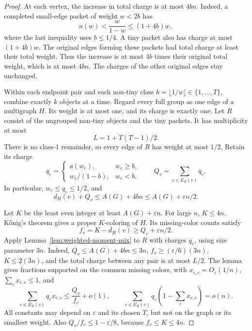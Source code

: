 \documentclass[11pt]{article}
\theoremstyle{definition}\newtheorem{algorithm}{Algorithm}[section]
\numberwithin{equation}{section}
\theoremstyle{remark}\newtheorem*{remark}{Remark}
\begin{document}
\begin{proof}
At each vertex, the increase in total charge is at most $4bn$.
Indeed, a completed small-edge packet of weight $w<2b$ has
\[
 a(w)<\frac{w}{1-w}\le(1+4b)w,
\]
where the last inequality uses $b\le1/4$.
A tiny packet also has charge at most $(1+4b)w$.
The original edges forming these packets had total charge at least
their total weight. Thus the increase is at most $4b$ times their
original total weight, which is at most $4bn$.
The charges of the other original edges stay unchanged.

Within each endpoint pair and each non-tiny class
$k=\lfloor1/w\rfloor\in\{1,\ldots,T\}$, combine exactly $k$ objects
at a time. Regard every full group as one edge of a multigraph $H$.
Its weight is at most one, and its charge is exactly one.
Let $R$ consist of the ungrouped non-tiny objects and the tiny packets.
It has multiplicity at most
\[
 L=1+T(T-1)/2.
\]
There is no class-$1$ remainder, so every edge of $R$ has weight at most
$1/2$. Retain its charge
\[
 q_e=\begin{cases}
 a(w_e),&w_e\ge b,\\
 w_e/(1-b),&w_e<b,
 \end{cases}
 \qquad Q_v=\sum_{e\in E_R(v)}q_e.
\]
In particular, $w_e\le q_e\le1/2$, and
\begin{equation}\label{eq:hload-charge}
 d_H(v)+Q_v\le A(G)+4bn\le A(G)+\varepsilon n/2.
\end{equation}

Let $K$ be the least even integer at least $A(G)+\varepsilon n$.
For large $n$, $K\le4n$.
K\H{o}nig's theorem gives a proper $K$-coloring of $H$.
Its missing-color counts satisfy
\[
 f_v=K-d_H(v)\ge Q_v+\varepsilon n/2.
\]
Apply Lemma~\ref{lem:weighted-moment-mix} to $R$ with charges $q_e$,
using size parameter $3n$. Indeed, $Q_v\le A(G)+4bn\le3n$,
$f_v\ge(\varepsilon/6)(3n)$, $K\le2(3n)$, and the total charge
between any pair is at most $L/2$.
The lemma gives fractions supported on the common missing colors,
with $x_{e,c}=O_\varepsilon(1/n)$, $\sum_cx_{e,c}\le1$, and
\[
 \sum_{e\in E_R(v)}q_ex_{e,c}\le\frac{Q_v}{f_v}+o(1),
 \qquad
 \sum_{e\in E_R(v)}q_e\left(1-\sum_cx_{e,c}\right)=o(n).
\]
All constants may depend on $\varepsilon$ and its chosen $T$, but not
on the graph or its smallest weight.
Also $Q_v/f_v\le1-\varepsilon/8$, because $f_v\le K\le4n$.


\end{proof}
\end{document}

